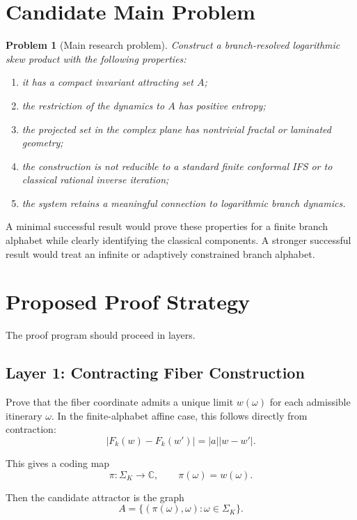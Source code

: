 \documentclass[12pt]{article}
\newtheorem{problem}{Problem}
\newcommand{\C}{\mathbb{C}}
\begin{document}
	\section{Candidate Main Problem}
	
	\begin{problem}[Main research problem]
		Construct a branch-resolved logarithmic skew product with the following properties:
		\begin{enumerate}
			\item it has a compact invariant attracting set \(A\);
			\item the restriction of the dynamics to \(A\) has positive entropy;
			\item the projected set in the complex plane has nontrivial fractal or laminated geometry;
			\item the construction is not reducible to a standard finite conformal IFS or to classical rational inverse iteration;
			\item the system retains a meaningful connection to logarithmic branch dynamics.
		\end{enumerate}
	\end{problem}
	
	A minimal successful result would prove these properties for a finite branch alphabet while clearly identifying the classical components. A stronger successful result would treat an infinite or adaptively constrained branch alphabet.
	
	\section{Proposed Proof Strategy}
	
	The proof program should proceed in layers.
	
	\subsection{Layer 1: Contracting Fiber Construction}
	
	Prove that the fiber coordinate admits a unique limit \(w(\omega)\) for each admissible itinerary \(\omega\). In the finite-alphabet affine case, this follows directly from contraction:
	\[
	|F_k(w)-F_k(w')|=|a||w-w'|.
	\]
	
	This gives a coding map
	\[
	\pi:\Sigma_K\to\C,
	\qquad
	\pi(\omega)=w(\omega).
	\]
	
	Then the candidate attractor is the graph
	\[
	A=\{(\pi(\omega),\omega):\omega\in\Sigma_K\}.
	\]
	
\end{document}
